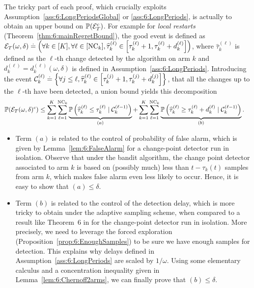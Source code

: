 The tricky part of each proof, which crucially exploits Assumption~\ref{ass:6:LongPeriodsGlobal} or \ref{ass:6:LongPeriods}, is actually to obtain an upper bound on $\mathbb{P}(\mathcal{E}_T^c)$. For example for \emph{local restarts} (Theorem~\ref{thm:6:mainRegretBound}), the good event is defined as
$\mathcal{E}_T(\omega,\delta) \overset{.}{=} \left(\forall k \in [K], \forall \ell \in [\text{NC}_k], \widehat{\tau}^{(\ell)}_k \in \left[\tau_k^{(\ell)} + 1, \tau_k^{(\ell)} + d_k^{(\ell)}\right] \right)$,
%
where $\widehat{\tau}_k^{(\ell)}$ is defined as the $\ell$-th change detected by the algorithm on arm $k$ and $d_k^{(\ell)} = d_k^{(\ell)}(\omega,\delta)$ is defined in Assumption~\ref{ass:6:LongPeriods}.
Introducing the event
$\mathcal{C}_k^{(\ell)} \overset{.}{=} \left\{\forall j \leq \ell, \widehat{\tau}_k^{(\ell)} \in \left[\tau_k^{(j)} + 1, \tau_k^{(j)} + d_k^{(j)} \right] \right\}$,
that all the changes up to the $\ell$-th have been detected, a union bound yields this decomposition
%
\begin{align}
    \mathbb{P}(\mathcal{E}_T(\omega,\delta)^c) & \leq \sum\limits_{k=1}^K\sum\limits_{\ell=1}^{\text{NC}_k} \underbrace{\mathbb{P}\left(\widehat{\tau}_k^{(\ell)} \leq \tau_k^{(\ell)} \;|\; \mathcal{C}_k^{(\ell-1)}\right)}_{(a)} + \sum\limits_{k=1}^K\sum\limits_{\ell=1}^{\text{NC}_k} \underbrace{\mathbb{P}\left(\widehat{\tau}_k^{(\ell)} \geq \tau_k^{(\ell)} + d_k^{(\ell)} \;|\; \mathcal{C}_k^{(\ell-1)}\right)}_{(b)}.
\end{align}

\begin{itemize}
\item
Term $(a)$ is related to the control of probability of false alarm, which is given by Lemma~\ref{lem:6:FalseAlarm} for a change-point detector run in isolation.
Observe that under the bandit algorithm, the change point detector associated to arm $k$ is based on (possibly much) less than $t - \tau_k(t)$ samples from arm $k$, which makes false alarm even less likely to occur. Hence, it is easy to show that $(a) \leq \delta$.

\item
Term $(b)$ is related to the control of the detection delay, which is more tricky to obtain under the \GLRklUCB{} adaptive sampling scheme,
when compared to a result like Theorem~6 in \cite{Maillard2018GLR} for the change-point detector run in isolation.
%
More precisely, we need to leverage the forced exploration (Proposition~\ref{prop:6:EnoughSamples}) to be sure we have enough samples for detection. This explains why delays defined in Assumption~\ref{ass:6:LongPeriods} are scaled by $1/\omega$.
Using some elementary calculus and a concentration inequality given in Lemma~\ref{lem:6:Chernoff2arms}, we can finally prove that $(b) \leq \delta$.
\end{itemize}

